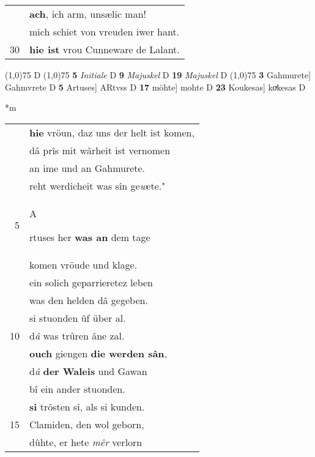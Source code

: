 \documentclass[8pt,a4paper,notitlepage]{article}
\begin{document}
\begin{table}[ht]
\begin{minipage}[t]{0.5\linewidth}
\begin{tabular}{rl}
 & \textbf{ach}, ich arm, unsælic man!\\ 
 & mich schiet von vreuden iwer hant.\\ 
30 & \textbf{hie ist} vrou Cunneware de Lalant.\\ 
\end{tabular}
\scriptsize
\line(1,0){75} \newline
D \newline
\line(1,0){75} \newline
\textbf{5} \textit{Initiale} D  \textbf{9} \textit{Majuskel} D  \textbf{19} \textit{Majuskel} D  \newline
\line(1,0){75} \newline
\textbf{3} Gahmurete] Gahmvrete D \textbf{5} Artuses] ARtvss D \textbf{17} möhte] mohte D \textbf{23} Koukesas] koͮkesas D \newline
\end{minipage}
\hspace{0.5cm}
\begin{minipage}[t]{0.5\linewidth}
\small
\begin{center}*m
\end{center}
\begin{tabular}{rl}
 & \textbf{hie} vröun, daz uns der helt ist komen,\\ 
 & dâ prîs mit wârheit ist vernomen\\ 
 & an ime und an Gahmurete.\\ 
 & reht werdicheit was sîn ge\textit{w}ete."\\ 
5 & \begin{large}A\end{large}rtuses her \textbf{was an} dem tage\\ 
 & komen vröude und klage.\\ 
 & ein solich geparrieretez leben\\ 
 & was den helden dâ gegeben.\\ 
 & si stuonden ûf über al.\\ 
10 & d\textit{â} was trûren âne zal.\\ 
 & \textbf{ouch} giengen \textbf{die werden sân},\\ 
 & d\textit{â} \textbf{der Waleis} und Gawan\\ 
 & bî ein ander stuonden.\\ 
 & \textbf{si} trôsten si, als si kunden.\\ 
15 & Clamiden, den wol geborn,\\ 
 & dûhte, er hete \textit{mêr} verlorn\\ 

\end{tabular}
\end{minipage}
\end{table}
\end{document}
